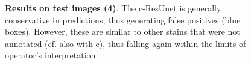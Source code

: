 \begin{figure}[ht]\ContinuedFloat
\centering
{}
\caption{\textbf{Results on test images (4)}. 
The c-ResUnet is generally conservative in predictions, thus generating false positives (blue boxes).
However, these are similar to other stains that were not annotated (cf. also with \hyperref[fig:predictions:false-positives]{c}), thus falling again within the limits of operator's interpretation
} 
\end{figure}













